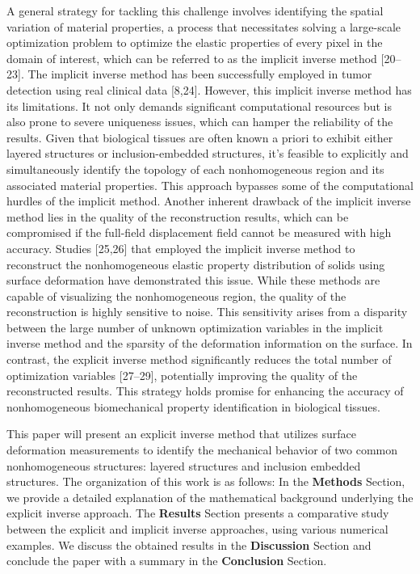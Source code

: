 \documentclass[11pt]{article}
\begin{document}
A general strategy for tackling this challenge involves identifying
the spatial variation of material properties, a process that
necessitates solving a large-scale optimization problem to optimize
the elastic properties of every pixel in the domain of interest,
which can be referred to as the implicit inverse method [20--23]. The
implicit inverse method has been successfully employed in tumor
detection using real clinical data [8,24]. However, this implicit
inverse method has its limitations. It not only demands significant
computational resources but is also prone to severe uniqueness
issues, which can hamper the reliability of the results. Given that
biological tissues are often known a priori to exhibit either layered
structures or inclusion-embedded structures, it's feasible to
explicitly and simultaneously identify the topology of each
nonhomogeneous region and its associated material properties. This
approach bypasses some of the computational hurdles of the implicit
method. Another inherent drawback of the implicit inverse method lies
in the quality of the reconstruction results, which can be
compromised if the full-field displacement field cannot be measured
with high accuracy. Studies [25,26] that employed the implicit
inverse method to reconstruct the nonhomogeneous elastic property
distribution of solids using surface deformation have demonstrated
this issue. While these methods are capable of visualizing the
nonhomogeneous region, the quality of the reconstruction is highly
sensitive to noise. This sensitivity arises from a disparity between
the large number of unknown optimization variables in the implicit
inverse method and the sparsity of the deformation information on the
surface. In contrast, the explicit inverse method significantly
reduces the total number of optimization variables [27--29],
potentially improving the quality of the reconstructed results. This
strategy holds promise for enhancing the accuracy of nonhomogeneous
biomechanical property identification in biological tissues.

This paper will present an explicit inverse method that utilizes
surface deformation measurements to identify the mechanical behavior
of two common nonhomogeneous structures: layered structures and
inclusion embedded structures. The organization of this work is as
follows: In the \textbf{Methods} Section, we provide a detailed
explanation of the mathematical background underlying the explicit
inverse approach. The \textbf{Results} Section presents a comparative
study between the explicit and implicit inverse approaches, using
various numerical examples. We discuss the obtained results in the
\textbf{Discussion} Section and conclude the paper with a summary in
the \textbf{Conclusion} Section.
\end{document}
